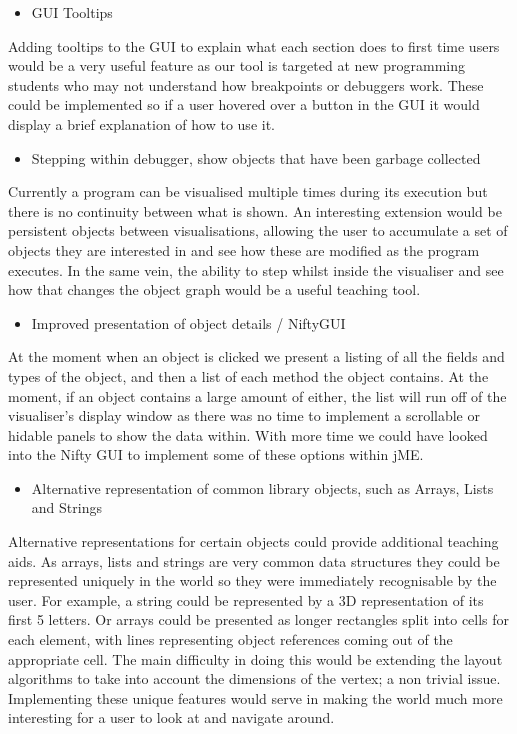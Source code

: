 \documentclass[11pt, a4paper]{report}
\begin{document}
\begin{itemize}
  \item GUI Tooltips
\end{itemize}

Adding tooltips to the GUI to explain what each section does to first time users would be a very useful feature as our tool is targeted at new programming students who may not understand how breakpoints or debuggers work. These could be implemented so if a user hovered over a button in the GUI it would display a brief explanation of how to use it.

\begin{itemize}
  \item Stepping within debugger, show objects that have been garbage collected
\end{itemize}

Currently a program can be visualised multiple times during its execution but there is no continuity between what is shown. An interesting extension would be persistent objects between visualisations, allowing the user to accumulate a set of objects they are interested in and see how these are modified as the program executes. In the same vein, the ability to step whilst inside the visualiser and see how that changes the object graph would be a useful teaching tool.

\begin{itemize}
  \item Improved presentation of object details / NiftyGUI
\end{itemize}

At the moment when an object is clicked we present a listing of all the fields and types of the object, and then a list of each method the object contains. At the moment, if an object contains a large amount of either, the list will run off of the visualiser’s display window as there was no time to implement a scrollable or hidable panels to show the data within. With more time we could have looked into the Nifty GUI to implement some of these options within jME.

\begin{itemize}
  \item Alternative representation of common library objects, such as Arrays, Lists and Strings
\end{itemize}

Alternative representations for certain objects could provide additional teaching aids. As arrays, lists and strings are very common data structures they could be represented uniquely in the world so they were immediately recognisable by the user. For example, a string could be represented by a 3D representation of its first 5 letters. Or arrays could be presented as longer rectangles split into cells for each element, with lines representing object references coming out of the appropriate cell. The main difficulty in doing this would be extending the layout algorithms to take into account the dimensions of the vertex; a non trivial issue. Implementing these unique features would serve in making the world much more interesting for a user to look at and navigate around.
\end{document}
